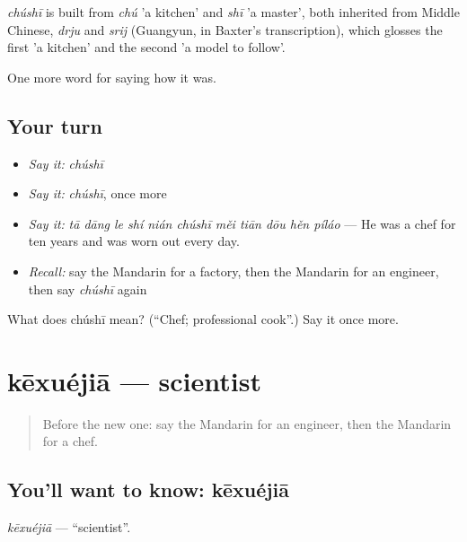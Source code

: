 \begin{cousinweb}
\emph{chúshī} is built from \emph{chú} 'a kitchen' and \emph{shī} 'a master', both inherited from Middle Chinese, \emph{drju} and \emph{srij} (Guangyun, in Baxter's transcription), which glosses the first 'a kitchen' and the second 'a model to follow'.
\end{cousinweb}

\begin{grammarlens}[title={What you've built}]
One more word for saying how it was.
\end{grammarlens}

\subsection*{Your turn}
\begin{itemize}
\raggedright
  \item \emph{Say it:} \emph{chúshī}
  \item \emph{Say it:} \emph{chúshī}, once more
  \item \emph{Say it:} \emph{tā dāng le shí nián chúshī měi tiān dōu hěn píláo} — He was a chef for ten years and was worn out every day.
  \item \emph{Recall:} say the Mandarin for a factory, then the Mandarin for an engineer, then say \emph{chúshī} again
\end{itemize}

\begin{tcolorbox}[breakable,colback=teal!4,colframe=teal!35!black,title={Before you move on}]
What does chúshī mean? (\textquotedblleft{}Chef; professional cook\textquotedblright{}.) Say it once more.
\end{tcolorbox}
\section[kēxuéjiā]{kēxuéjiā — scientist}

\label{lesson:ZH-C488-kexuejia}



\begin{quote}
Before the new one: say the Mandarin for an engineer, then the Mandarin for a chef.
\end{quote}

\subsection*{You'll want to know: kēxuéjiā}
\emph{kēxuéjiā} — \textquotedblleft{}scientist\textquotedblright{}.

